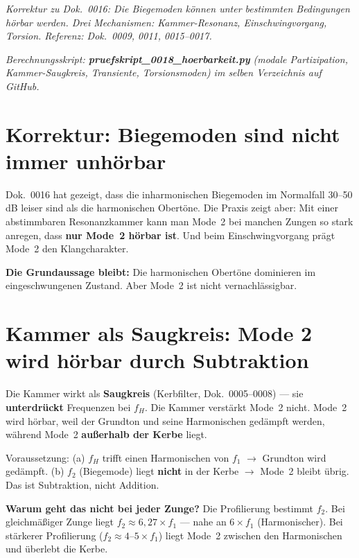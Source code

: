 \documentclass[11pt,a4paper]{article}
\begin{document}
\hbmaketitle
\noindent\textit{Korrektur zu Dok.~0016: Die Biegemoden können unter bestimmten Bedingungen
hörbar werden. Drei Mechanismen: Kammer-Resonanz, Einschwingvorgang, Torsion.
Referenz: Dok.~0009, 0011, 0015--0017.}

\noindent\textit{\small Berechnungsskript:
\textbf{pruefskript\_0018\_hoerbarkeit.py} (modale Partizipation,
Kammer-Saugkreis, Transiente, Torsionsmoden) im selben Verzeichnis auf GitHub.}

\section{Korrektur: Biegemoden sind nicht immer unhörbar}

Dok.~0016 hat gezeigt, dass die inharmonischen Biegemoden im Normalfall
30--50\,dB leiser sind als die harmonischen Obertöne.
Die Praxis zeigt aber: Mit einer abstimmbaren Resonanzkammer kann man
Mode~2 bei manchen Zungen so stark anregen, dass \textbf{nur Mode~2 hörbar ist}.
Und beim Einschwingvorgang prägt Mode~2 den Klangcharakter.

\begin{tcolorbox}[colframe=red!60!black, colback=red!5!white]
\textbf{Die Grundaussage bleibt:} Die harmonischen Obertöne dominieren
im eingeschwungenen Zustand. Aber Mode~2 ist nicht vernachlässigbar.
\end{tcolorbox}

\section{Kammer als Saugkreis: Mode 2 wird hörbar durch Subtraktion}

Die Kammer wirkt als \textbf{Saugkreis} (Kerbfilter, Dok.~0005--0008) ---
sie \textbf{unterdrückt} Frequenzen bei $f_H$. Die Kammer verstärkt Mode~2 nicht.
Mode~2 wird hörbar, weil der Grundton und seine Harmonischen gedämpft werden,
während Mode~2 \textbf{außerhalb der Kerbe} liegt.

Voraussetzung: (a) $f_H$ trifft einen Harmonischen von $f_1$ $\to$ Grundton
wird gedämpft. (b) $f_2$ (Biegemode) liegt \textbf{nicht} in der Kerbe
$\to$ Mode~2 bleibt übrig. Das ist Subtraktion, nicht Addition.

\textbf{Warum geht das nicht bei jeder Zunge?} Die Profilierung bestimmt $f_2$.
Bei gleichmäßiger Zunge liegt $f_2 \approx 6{,}27 \times f_1$ --- nahe an
$6 \times f_1$ (Harmonischer). Bei stärkerer Profilierung ($f_2 \approx 4$--$5 \times f_1$)
liegt Mode~2 zwischen den Harmonischen und überlebt die Kerbe.
\end{document}
